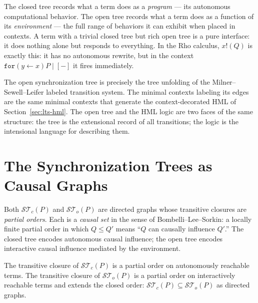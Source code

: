 \begin{remark}
The closed tree records what a term does as a \emph{program} ---
its autonomous computational behavior.
The open tree records what a term does as a function of its
\emph{environment} --- the full range of behaviors it can exhibit
when placed in contexts.
A term with a trivial closed tree but rich open tree is a pure
interface: it does nothing alone but responds to everything.
In the Rho calculus, $x!(Q)$ is exactly this: it has no
autonomous rewrite, but in the context
$\mathtt{for}(y \leftarrow x)P \mid [-]$ it fires immediately.
\end{remark}

\begin{remark}
The open synchronization tree is precisely the tree unfolding of
the Milner--Sewell--Leifer labeled transition system.
The minimal contexts labeling its edges are the same minimal
contexts that generate the context-decorated HML of
Section~\ref{sec:lts-hml}.
The open tree and the HML logic are two faces of the same
structure: the tree is the extensional record of all transitions;
the logic is the intensional language for describing them.
\end{remark}

\section{The Synchronization Trees as Causal Graphs}

\begin{definition}
Both $\mathcal{ST}_c(P)$ and $\mathcal{ST}_o(P)$ are directed
graphs whose transitive closures are \emph{partial orders}.
Each is a \emph{causal set} in the sense of Bombelli--Lee--Sorkin:
a locally finite partial order in which $Q \leq Q'$ means
``$Q$ can causally influence $Q'$.''
The closed tree encodes autonomous causal influence;
the open tree encodes interactive causal influence mediated
by the environment.
\end{definition}

\begin{proposition}
The transitive closure of $\mathcal{ST}_c(P)$ is a partial order
on autonomously reachable terms.
The transitive closure of $\mathcal{ST}_o(P)$ is a partial order
on interactively reachable terms and extends the closed order:
$\mathcal{ST}_c(P) \subseteq \mathcal{ST}_o(P)$ as directed graphs.
\end{proposition}

